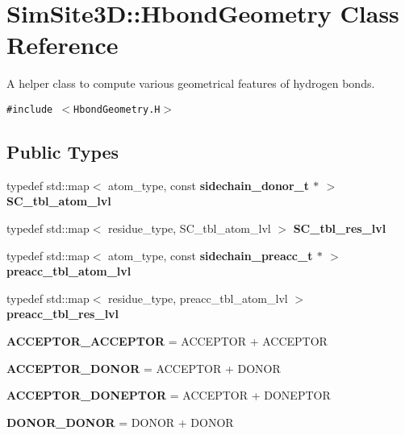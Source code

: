 \section{SimSite3D::Hbond\-Geometry Class Reference}
\label{classSimSite3D_1_1HbondGeometry}
A helper class to compute various geometrical features of hydrogen bonds.  


{\tt \#include $<$Hbond\-Geometry.H$>$}

\subsection*{Public Types}
\begin{CompactItemize}
\item 
typedef std::map$<$ atom\_\-type, const \bf{sidechain\_\-donor\_\-t} $\ast$ $>$ \textbf{SC\_\-tbl\_\-atom\_\-lvl}\label{classSimSite3D_1_1HbondGeometry_d4cc22996235d8e42553648883ab0ff9}

\item 
typedef std::map$<$ residue\_\-type, SC\_\-tbl\_\-atom\_\-lvl $>$ \textbf{SC\_\-tbl\_\-res\_\-lvl}\label{classSimSite3D_1_1HbondGeometry_78c70a6cd40282285300c5182331d7ee}

\item 
typedef std::map$<$ atom\_\-type, const \bf{sidechain\_\-preacc\_\-t} $\ast$ $>$ \textbf{preacc\_\-tbl\_\-atom\_\-lvl}\label{classSimSite3D_1_1HbondGeometry_925f736c4878f7dc63eeeca1118fbf2f}

\item 
typedef std::map$<$ residue\_\-type, preacc\_\-tbl\_\-atom\_\-lvl $>$ \textbf{preacc\_\-tbl\_\-res\_\-lvl}\label{classSimSite3D_1_1HbondGeometry_c6183711d166dd7189ebdc4d76e957ef}

\item 
\textbf{ACCEPTOR\_\-ACCEPTOR} = ACCEPTOR + ACCEPTOR\label{classSimSite3D_1_1HbondGeometry_c0cc28273dcab0f6d690a41ff295b4c7f49b49a92bbe24428a7c650861ac95be}

\item 
\textbf{ACCEPTOR\_\-DONOR} = ACCEPTOR + DONOR\label{classSimSite3D_1_1HbondGeometry_c0cc28273dcab0f6d690a41ff295b4c78cb38b64e9d0137e0587012fc849f4f8}

\item 
\textbf{ACCEPTOR\_\-DONEPTOR} = ACCEPTOR + DONEPTOR\label{classSimSite3D_1_1HbondGeometry_c0cc28273dcab0f6d690a41ff295b4c70dc886ed7385a07a0b2581df51e71ca5}

\item 
\textbf{DONOR\_\-DONOR} = DONOR + DONOR\label{classSimSite3D_1_1HbondGeometry_c0cc28273dcab0f6d690a41ff295b4c7fd76d0c5d776c2ebbda73bad9765b86e}


\end{CompactItemize}
